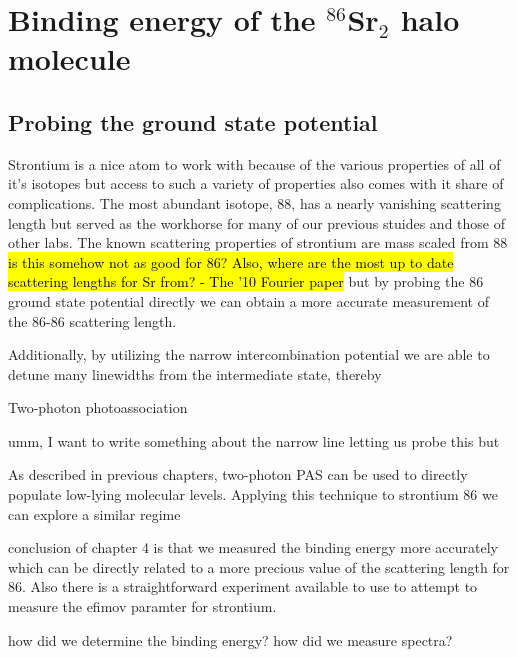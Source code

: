 \chapter{Binding energy of the $^{86}$Sr$_2$ halo molecule}
\label{ch:chap4}

\section{Probing the ground state potential}
\label{sec:lowE_intro}

Strontium is a nice atom to work with because of the various properties of all of it's isotopes but access to such a variety of properties also comes with it share of complications. The most abundant isotope, 88, has a nearly vanishing scattering length but served as the workhorse for many of our previous stuides and those of other labs. The known scattering properties of strontium are mass scaled from 88 \hl{is this somehow not as good for 86? Also, where are the most up to date scattering lengths for Sr from? - The '10 Fourier paper} but by probing the 86 ground state potential directly we can obtain a more accurate measurement of the 86-86 scattering length.

Additionally, by utilizing the narrow intercombination potential we are able to detune many linewidths from the intermediate state, thereby 

Two-photon photoassociation 

umm, I want to write something about the narrow line letting us probe this but 

As described in previous chapters, two-photon PAS can be used to directly populate low-lying molecular levels. Applying this technique to strontium 86 we can explore a similar regime

conclusion of chapter 4 is that we measured the binding energy more accurately which can be directly related to a more precious value of the scattering length for 86. Also there is a straightforward experiment available to use to attempt to measure the efimov paramter for strontium.

how did we determine the binding energy? how did we measure spectra?


